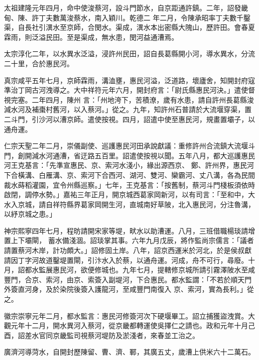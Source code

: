 \begin{pinyinscope}
 太祖建隆元年四月，命中使浚蔡河，設斗門節水，自京距通許鎮。二年，詔發畿甸、陳、許丁夫數萬浚蔡水，南入穎川。乾德二
 年二月，令陳承昭率丁夫數千鑿渠，自長社引潩水至京師，合閔水。渠成，潩水本出密縣大隗山，歷許田。會春夏霖雨，則泛溢民田。至是渠成，無水患，閔河益通漕焉。



 太宗淳化二年，以水異水泛溢，浸許州民田，詔自長葛縣開小河，導水異水，分流二十里，合於惠民河。



 真宗咸平五年七月，京師霖雨，溝洫壅，惠民河溢，泛道路，壞廬舍，知開封府寇準治丁岡古河洩導之。大中祥符元年六月，開封府言：「尉氏縣惠民河決。」遣使督視完塞。二年四月，陳州
 言：「州地洿下，苦積潦，歲有水患，請自許州長葛縣浚減水河及補棗村舊河，以入蔡河。」從之。九年，知許州石普請於大流堰穿渠，置二斗門，引沙河以漕京師。遣使按視。四月，詔遣中使至惠民河，規畫置壩子，以通舟運。



 仁宗天聖二年二月，崇儀副使、巡護惠民河田承說獻議：重修許州合流鎮大流堰斗門，創開減水河通漕，省迂路五百里。詔遣使按視以聞。五年八月，都大巡護惠民河王克基言：「先準宣惠民、京、索河水淺小，緣出源西京、
 鄭、許州界，惠民河下合橫溝、白雁溝、京、索河下合西河、湖河、雙河、欒霸河、丈八溝，各為民間裁水蒔稻灌園，宜令州縣巡察。」七年，王克基言：「按舊制，蔡河斗門棧板須依時啟閉，調停水勢。」嘉祐三年正月，開京城西葛家岡新河，以有司言：「至和中，大水入京城，請自祥符縣界葛家岡開生河，直城南好草陂，北入惠民河，分注魯溝，以紓京城之患。」



 神宗熙寧四年七月，程昉請開宋家等堤，畎水以助漕運。八月，三班借職楊琰請增置上下壩閘，
 蓄水備淺涸。詔琰掌其事。六年九月戊辰，將作監尚宗儒言：「議者請置蔡河木岸，計功頗大。」詔修固土岸。八年，詔京西運米於河北，於是侯叔獻請因丁字河故道鑿堤置閘，引汴水入於蔡，以通舟運。河成，舟不可行，尋廢。十月，詔都水監展惠民河，欲便修城也。九年七月，提轄修京城所請引霧澤陂水至咸豐門，合京、索河，由京、索簽入副堤河，下合惠民。都水監謂：「不若於順天門外簽直河身，及於染院後簽入護龍河，至咸豐門南復入
 京、索河，實為長利。」從之。



 徽宗崇寧元年二月，都水監言：惠民河修簽河次下硬堰畢工。詔立捕獲盜洩賞。大觀元年十二月，開水異河入蔡河，從京畿都轉運使吳擇仁之請也。政和元年十月己酉，詔差水官同京畿監司視蔡河堤防及淤淺者，來春並工治之。



 廣濟河導菏水，自開封歷陳留、曹、濟、鄆，其廣五丈，歲漕上供米六十二萬石。




\end{pinyinscope}
